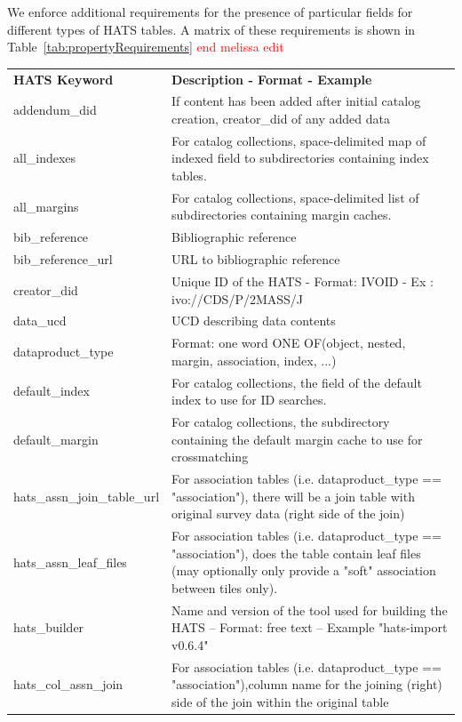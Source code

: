 \documentclass[11pt,a4paper]{ivoa}
\begin{document}
We enforce additional requirements for the presence of particular fields for different types of HATS tables. A matrix of these requirements is shown in Table~\ref{tab:propertyRequirements}
\textcolor{red}{end melissa edit}
\footnotesize\begin{longtable}[h!]{D{0.33\textwidth} D{0.67\textwidth}}

\sptablerule
\textbf{HATS Keyword}&\textbf{Description - Format - Example}\\
\sptablerule
\endhead

addendum\_did &If content has been added after initial catalog creation, creator\_did of any added data \\
all\_indexes &For catalog collections, space-delimited map of indexed field to subdirectories containing index tables. \\
all\_margins &For catalog collections, space-delimited list of subdirectories containing margin caches. \\
bib\_reference &Bibliographic reference \\
bib\_reference\_url &URL to bibliographic reference \\
creator\_did &Unique ID of the HATS - Format: IVOID - Ex : ivo://CDS/P/2MASS/J \\
data\_ucd &UCD describing data contents \\
dataproduct\_type &Format: one word ONE OF(object, nested, margin, association, index, ...) \\
default\_index &For catalog collections, the field of the default index to use for ID searches. \\
default\_margin &For catalog collections, the subdirectory containing the default margin cache to use for crossmatching \\
hats\_assn\_join\_table\_url &For association tables (i.e. dataproduct\_type == "association"), there will be a join table with original survey data (right side of the join) \\
hats\_assn\_leaf\_files &For association tables (i.e. dataproduct\_type == "association"), does the table contain leaf files (may optionally only provide a "soft" association between tiles only). \\
hats\_builder &Name and version of the tool used for building the HATS – Format: free text -- Example "hats-import v0.6.4" \\
hats\_col\_assn\_join &For association tables (i.e. dataproduct\_type == "association"),column name for the joining (right) side of the join within the original table \\

\end{longtable}
\end{document}
